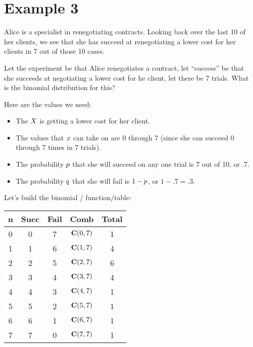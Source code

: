 \documentclass[../../../main.tex]{subfiles}
\begin{document}
\section{Example 3}

Alice is a specialist in renegotiating contracts. Looking back over the last 10 of her clients, we see that she has succeed at renegotiating a lower cost for her clients in 7 out of those 10 cases.

Let the experiment be that Alice renegotiates a contract, let ``success'' be that she succeeds at negotiating a lower cost for he client, let there be 7 trials. What is the binomial distribution for this?

Here are the values we need:

\begin{itemize}
  \item The $\RandVar/$ is getting a lower cost for her client.
  \item The values that $\RandVarVal/$ can take on are 0 through 7 (since she can succeed 0 through 7 times in 7 trials).
  \item The probability $\success/$ that she will succeed on any one trial is 7 out of 10, or .7.
  \item The probability $\failure/$ that she will fail is $1 - \success/$, or $1 - .7 = .3$.
\end{itemize}

\noindent
Let's build the binomial \PDFtext/ function/table:

\begin{center}
  \begin{tabular}{| c | c | c | c | c |}
    \hline
  \textbf{n} & \textbf{Succ} & \textbf{Fail} & \textbf{Comb} & \textbf{Total} \\ \hline
  0 & 0    & 7    & $\mathbf{C}(0, 7)$ & 1 \\ \hline
  1 & 1    & 6    & $\mathbf{C}(1, 7)$ & 4 \\ \hline
  2 & 2    & 5    & $\mathbf{C}(2, 7)$ & 6 \\ \hline
  3 & 3    & 4    & $\mathbf{C}(3, 7)$ & 4 \\ \hline
  4 & 4    & 3    & $\mathbf{C}(4, 7)$ & 1 \\ \hline
  5 & 5    & 2    & $\mathbf{C}(5, 7)$ & 1 \\ \hline
  6 & 6    & 1    & $\mathbf{C}(6, 7)$ & 1 \\ \hline
  7 & 7    & 0    & $\mathbf{C}(7, 7)$ & 1 \\ \hline
  \end{tabular}
\end{center}
\end{document}
